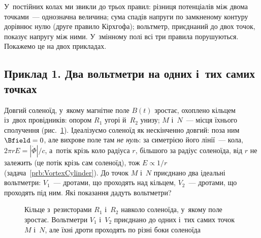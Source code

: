У~постійних колах ми звикли до трьох правил: різниця потенціалів між двома точками~--- однозначна величина; сума спадів напруги по замкненому контуру дорівнює
нулю (друге правило Кірхгофа); вольтметр, приєднаний до двох точок, показує напругу між ними. У~змінному полі всі три правила порушуються. Покажемо це на двох прикладах.

\subsection*{Приклад 1. Два вольтметри на одних і~тих самих точках}

Довгий соленоїд, у~якому магнітне поле $B(t)$ зростає, охоплено кільцем із~двох провідників: опором $R_1$ угорі й~$R_2$ унизу; $M$ і~$N$~--- місця їхнього
сполучення (рис.~\ref{pic:TwoVoltmeters}). Ідеалізуємо соленоїд як нескінченно довгий: поза ним $\Bfield=0$, але вихрове поле там \emph{не нуль}: за симетрією його лінії~--- кола, $2\pi rE=|\dot\Phi|/c$, а~потік крізь коло радіуса $r$, більшого за радіус соленоїда, від $r$ не залежить (це потік крізь сам соленоїд), тож $E\propto1/r$ (задача~\ref{prb:VortexCylinder}). До точок $M$ і~$N$ приєднано два ідеальні вольтметри: $V_1$~--- дротами, що проходять над
кільцем, $V_2$~--- дротами, що проходять під ним. Які показання дадуть вольтметри?

\begin{figure}\centering
	\caption{Кільце з~резисторами $R_1$ і~$R_2$ навколо соленоїда, у~якому поле зростає. Вольтметри $V_1$ і~$V_2$ приєднано до одних і~тих самих точок
		$M$ і~$N$, але їхні дроти проходять по різні боки соленоїда\label{pic:TwoVoltmeters}}
\end{figure}

